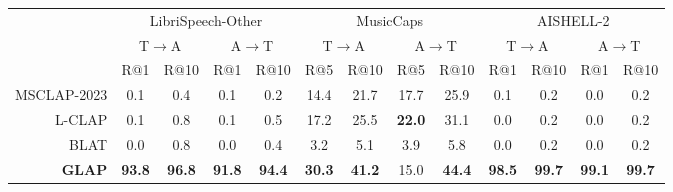 \vspace{0.5cm}
\begin{center}
\fontsize{26pt}{30pt}\selectfont
\setlength{\tabcolsep}{4pt}
\begin{tabular}{r|cccc|cccc|cccc}
\toprule
& \multicolumn{4}{c|}{LibriSpeech-Other} & \multicolumn{4}{c|}{MusicCaps} & \multicolumn{4}{c}{AISHELL-2} \\
& \multicolumn{2}{c}{T$\rightarrow$A} & \multicolumn{2}{c|}{A$\rightarrow$T} & \multicolumn{2}{c}{T$\rightarrow$A} & \multicolumn{2}{c|}{A$\rightarrow$T} & \multicolumn{2}{c}{T$\rightarrow$A} & \multicolumn{2}{c}{A$\rightarrow$T} \\
 & R@1 & R@10 & R@1 & R@10 & R@5 & R@10 & R@5 & R@10 & R@1 & R@10 & R@1 & R@10 \\
\midrule
MSCLAP-2023 & 0.1 & 0.4 & 0.1 & 0.2 & 14.4 & 21.7 & 17.7 & 25.9 & 0.1 & 0.2 & 0.0 & 0.2 \\
L-CLAP & 0.1 & 0.8 & 0.1 & 0.5 & 17.2 & 25.5 & \textbf{22.0} & 31.1 & 0.0 & 0.2 & 0.0 & 0.2 \\
BLAT & 0.0 & 0.8 & 0.0 & 0.4 & 3.2 & 5.1 & 3.9 & 5.8 & 0.0 & 0.2 & 0.0 & 0.2 \\
\hline
\textbf{GLAP} & \textbf{93.8} & \textbf{96.8} & \textbf{91.8} & \textbf{94.4} & \textbf{30.3} & \textbf{41.2} & 15.0 & \textbf{44.4} & \textbf{98.5} & \textbf{99.7} & \textbf{99.1} & \textbf{99.7} \\
\bottomrule
\end{tabular}
\end{center}
